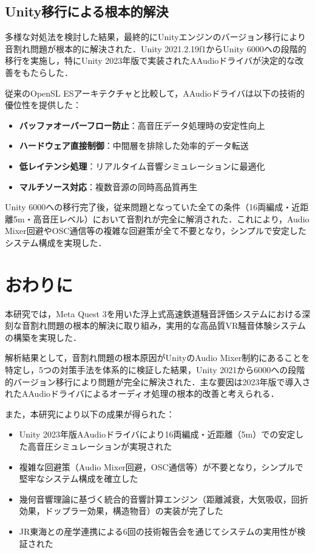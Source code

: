 \documentclass[10pt]{jsarticle}
\begin{document}
\subsection{Unity移行による根本的解決}
多様な対処法を検討した結果，最終的にUnityエンジンのバージョン移行により音割れ問題が根本的に解決された．Unity 2021.2.19f1からUnity 6000への段階的移行を実施し，特にUnity 2023年版で実装されたAAudioドライバが決定的な改善をもたらした．

従来のOpenSL ESアーキテクチャと比較して，AAudioドライバは以下の技術的優位性を提供した：
\begin{itemize}
\item \textbf{バッファオーバーフロー防止}：高音圧データ処理時の安定性向上
\item \textbf{ハードウェア直接制御}：中間層を排除した効率的データ転送
\item \textbf{低レイテンシ処理}：リアルタイム音響シミュレーションに最適化
\item \textbf{マルチソース対応}：複数音源の同時高品質再生
\end{itemize}

Unity 6000への移行完了後，従来問題となっていた全ての条件（16両編成・近距離5m・高音圧レベル）において音割れが完全に解消された．これにより，Audio Mixer回避やOSC通信等の複雑な回避策が全て不要となり，シンプルで安定したシステム構成を実現した．

\section{おわりに}
本研究では，Meta Quest 3を用いた浮上式高速鉄道騒音評価システムにおける深刻な音割れ問題の根本的解決に取り組み，実用的な高品質VR騒音体験システムの構築を実現した．

解析結果として，音割れ問題の根本原因がUnityのAudio Mixer制約にあることを特定し，5つの対策手法を体系的に検証した結果，Unity 2021から6000への段階的バージョン移行により問題が完全に解決された．主な要因は2023年版で導入されたAAudioドライバによるオーディオ処理の根本的改善と考えられる．

また，本研究により以下の成果が得られた：
\begin{itemize}
\item Unity 2023年版AAudioドライバにより16両編成・近距離（5m）での安定した高音圧シミュレーションが実現された
\item 複雑な回避策（Audio Mixer回避，OSC通信等）が不要となり，シンプルで堅牢なシステム構成を確立した
\item 幾何音響理論に基づく統合的音響計算エンジン（距離減衰，大気吸収，回折効果，ドップラー効果，構造物音）の実装が完了した
\item JR東海との産学連携による6回の技術報告会を通じてシステムの実用性が検証された
\end{itemize}
\end{document}
